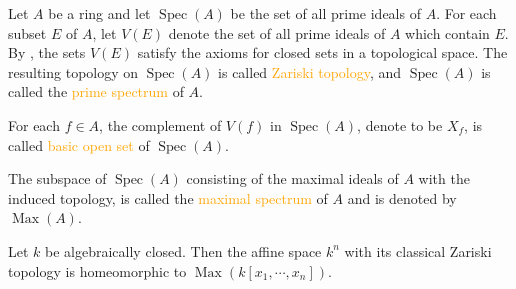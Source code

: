 \begin{definition}
	Let $A$ be a ring and let $\operatorname{Spec}(A)$ be the set of all prime ideals of $A$. For each subset $E$ of $A$, let $V(E)$ denote the set of all prime ideals of $A$ which contain $E$. By , the sets $V(E)$ satisfy the axioms for closed sets in a topological space. The resulting topology on $\operatorname{Spec}(A)$ is called \textcolor{orange}{Zariski topology}, and $\operatorname{Spec}(A)$ is called the \textcolor{orange}{prime spectrum} of $A$.

For each $f\in A$, the complement of $V(f)$ in $\operatorname{Spec}(A)$, denote to be $X_f$, is called \textcolor{orange}{basic open set} of $\operatorname{Spec}(A)$.

The subspace of $\operatorname{Spec}(A)$ consisting of the maximal ideals of $A$ with the induced topology, is called the \textcolor{orange}{maximal spectrum} of $A$ and is denoted by $\operatorname{Max}(A)$.
\end{definition}

\begin{proposition*}[\Cref{ex1.27}]
	Let $k$ be algebraically closed. Then the affine space $k^n$ with its classical Zariski topology is homeomorphic to $\operatorname{Max}(k[x_1,\cdots,x_n])$.
\end{proposition*}
